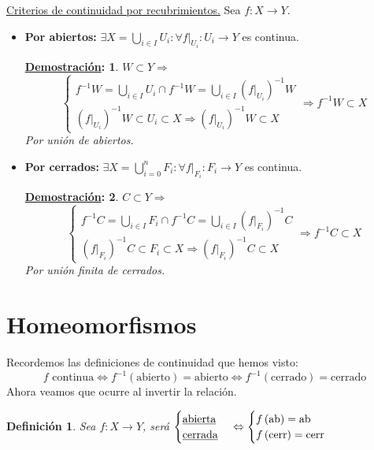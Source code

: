 \documentclass[10pt,a4paper,openright]{book}
\theoremstyle{break}
\newtheorem*{defi}{Definición}
\newtheorem*{demo}{\underline{Demostración}:}
\begin{document}
\underline{Criterios de continuidad por recubrimientos.} Sea $f: X \rightarrow Y$. 
\begin{itemize}
    \item \textbf{Por abiertos:} $\exists X = \bigcup_{i \in  I} U_i: \forall f|_{U_i} : U_i \rightarrow Y$ es continua. 

    \begin{demo}
    $W \subset Y \Rightarrow$
    \[
    \begin{cases}
        f^{-1}W = \bigcup_{i \in  I} U_i \cap f^{-1} W = \bigcup_{i \in  I} \left( f|_{U_i} \right)^{-1} W\\
        \left( f|_{U_i} \right)^{-1}W \subset U_i \subset X \Rightarrow \left( f|_{U_i} \right)^{-1} W \subset X
    \end{cases}\Rightarrow f^{-1}W \subset X  
    \]
    Por unión de abiertos.
    \end{demo}

    \item \textbf{Por cerrados:} $\exists X = \bigcup_{i = 0}^{n} F_i: \forall f|_{F_i} : F_i \rightarrow Y$ es continua. 

    \begin{demo}
    $C \subset Y \Rightarrow$
    \[
    \begin{cases}
        f^{-1}C = \bigcup_{i \in  I} F_i \cap f^{-1} C = \bigcup_{i \in  I} \left( f|_{F_i} \right)^{-1} C\\
        \left( f|_{F_i} \right)^{-1}C \subset F_i \subset X \Rightarrow \left( f|_{F_i} \right)^{-1} C \subset X
    \end{cases}\Rightarrow f^{-1}C \subset X  
    \]
    Por unión finita de cerrados.
    \end{demo}
\end{itemize}

\section{Homeomorfismos}%
\label{sec:homeomorfismos}
Recordemos las definiciones de continuidad que hemos visto:
\[
f \text{ continua} \Leftrightarrow f^{-1}\left( \text{abierto} \right) = \text{abierto} \Leftrightarrow f^{-1}\left( \text{cerrado} \right) = \text{cerrado} 
\]
Ahora veamos que ocurre al invertir la relación.
\begin{defi}
Sea $f: X \rightarrow Y$, será $\begin{cases}
    \text{\underline{abierta}} \\
    \text{\underline{cerrada}} 
\end{cases} \Leftrightarrow \begin{cases}
    f\left( \text{ab} \right) = \text{ab}\\
    f\left( \text{cerr} \right) = \text{cerr} 
\end{cases} $    
\end{defi}
\end{document}
